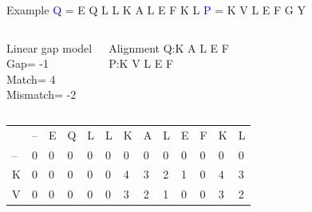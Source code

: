 \documentclass{bredelebeamer}
\begin{document}
\begin{frame}{Example}
 \centering
 \textcolor{blue}{Q} = E Q L L K A L E F K L \quad \textcolor{blue}{P} = K V L E F G Y
\begin{columns}
\begin{block}{Linear gap model} \\
Gap= -1 \\
Match= 4 \\
Mismatch= -2
\end{block}
\begin{block}{Alignment}
Q:\quad K A L E F \\
P:\quad K V L E F
\end{block}
\end{columns}
\begin{table}[]
\centering
\begin{tabular}{*{13}{p{0.4cm}}}
                        & --                     & E                      & Q                      & L                      & L                                              & K                                              & A                                              & L                                              & E                                               & F                                               & K                       & L                       \\ \cline{2-13} 
\multicolumn{1}{l|}{--} & \multicolumn{1}{l|}{0} & \multicolumn{1}{l|}{0} & \multicolumn{1}{l|}{0} & \multicolumn{1}{l|}{0} &  \multicolumn{1}{l|}{\cellcolor[HTML]{3166FF}0} & \multicolumn{1}{l|}{0}                         & \multicolumn{1}{l|}{0}                         & \multicolumn{1}{l|}{0}                         & \multicolumn{1}{l|}{0}                          & \multicolumn{1}{l|}{0}                          & \multicolumn{1}{l|}{0}  & \multicolumn{1}{l|}{0}  \\ \cline{2-13} 
\multicolumn{1}{l|}{K}  & \multicolumn{1}{l|}{0} & \multicolumn{1}{l|}{0} & \multicolumn{1}{l|}{0} & \multicolumn{1}{l|}{0} & \multicolumn{1}{l|}{0}                         &\multicolumn{1}{l|}{\cellcolor[HTML]{3166FF}4} & \multicolumn{1}{l|}{\cellcolor[HTML]{EFEFEF}3} & \multicolumn{1}{l|}{2}                         & \multicolumn{1}{l|}{1}                          & \multicolumn{1}{l|}{0}                          & \multicolumn{1}{l|}{4}  & \multicolumn{1}{l|}{3}  \\ \cline{2-13} 
\multicolumn{1}{l|}{V}  & \multicolumn{1}{l|}{0} & \multicolumn{1}{l|}{0} & \multicolumn{1}{l|}{0} & \multicolumn{1}{l|}{0} & \multicolumn{1}{l|}{0}                         & \multicolumn{1}{l|}{\cellcolor[HTML]{EFEFEF}3} & \multicolumn{1}{l|}{\cellcolor[HTML]{3166FF}2} & \multicolumn{1}{l|}{1}                         & \multicolumn{1}{l|}{0}                          & \multicolumn{1}{l|}{0}                          & \multicolumn{1}{l|}{3}  & \multicolumn{1}{l|}{2}  \\ \cline{2-13} %

\end{tabular}
\end{table}
\end{frame}
\end{document}
